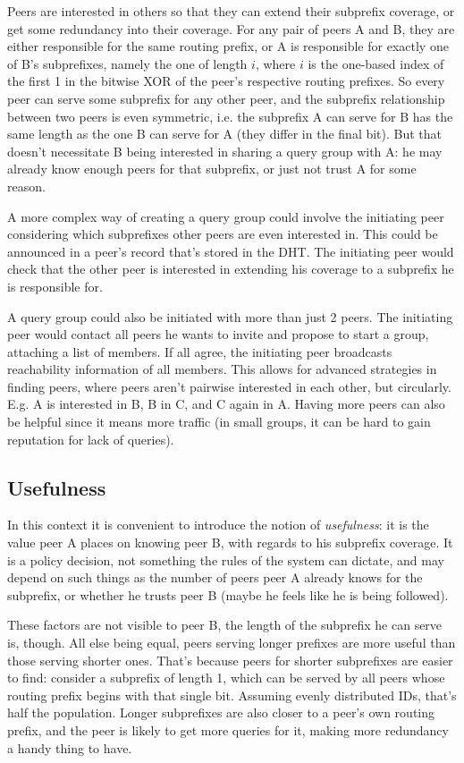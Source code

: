 Peers are interested in others so that they can extend their subprefix coverage,
or get some redundancy into their coverage. For any pair of peers A and B, they
are either responsible for the same routing prefix, or A is responsible for
exactly one of B's subprefixes, namely the one of length $i$, where $i$ is the
one-based index of the first 1 in the bitwise XOR of the peer's respective
routing prefixes. So every peer can serve some subprefix for any other peer, and
the subprefix relationship between two peers is even symmetric, i.e. the
subprefix A can serve for B has the same length as the one B can serve for A
(they differ in the final bit). But that doesn't necessitate B being interested
in sharing a query group with A: he may already know enough peers for that
subprefix, or just not trust A for some reason.

A more complex way of creating a query group could involve the initiating peer
considering which subprefixes other peers are even interested in. This could be
announced in a peer's record that's stored in the DHT. The initiating peer would
check that the other peer is interested in extending his coverage to a subprefix
he is responsible for.

A query group could also be initiated with more than just 2 peers. The
initiating peer would contact all peers he wants to invite and propose to start
a group, attaching a list of members. If all agree, the initiating peer
broadcasts reachability information of all members. This allows for advanced
strategies in finding peers, where peers aren't pairwise interested in each
other, but circularly. E.g. A is interested in B, B in C, and C again in A.
Having more peers can also be helpful since it means more traffic (in small
groups, it can be hard to gain reputation for lack of queries).

\subsection{Usefulness}
\label{sec:desc_usefulness}
In this context it is convenient to introduce the notion of \emph{usefulness}:
it is the value peer A places on knowing peer B, with regards to his subprefix
coverage. It is a policy decision, not something the rules of the system can
dictate, and may depend on such things as the number of peers peer A already
knows for the subprefix, or whether he trusts peer B (maybe he feels like he is
being followed).

These factors are not visible to peer B, the length of the subprefix he can
serve is, though. All else being equal, peers serving longer prefixes are more
useful than those serving shorter ones. That's because peers for shorter
subprefixes are easier to find: consider a subprefix of length 1, which can be
served by all peers whose routing prefix begins with that single bit. Assuming
evenly distributed IDs, that's half the population. Longer subprefixes are also
closer to a peer's own routing prefix, and the peer is likely to get more
queries for it, making more redundancy a handy thing to have.

